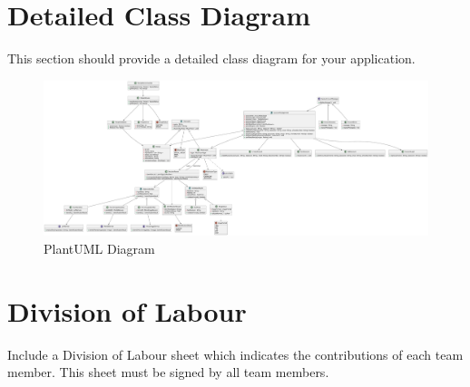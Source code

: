 \documentclass[]{article}
\begin{document}
\clearpage
\section{Detailed Class Diagram}
\label{sec:detailed_class_diagram}
This section should provide a detailed class diagram for your application.
\begin{figure}[h]
    \centering
    \includegraphics[width=\textwidth]{DetailedClassDiagram4.pdf}
    \caption{PlantUML Diagram}
\end{figure}

\clearpage
\appendix
\section{Division of Labour}
\label{sec:division_of_labour}
Include a Division of Labour sheet which indicates the contributions of each team member. This sheet must be signed by all team members.

\newpage
\end{document}
